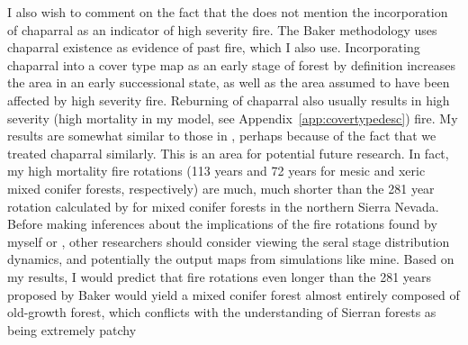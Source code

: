 I also wish to comment on the fact that the \citet{Fule2014} does not mention the incorporation of chaparral as an indicator of high severity fire. The Baker methodology uses chaparral existence as evidence of past fire, which I also use. Incorporating chaparral into a cover type map as an early stage of forest by definition increases the area in an early successional state, as well as the area assumed to have been affected by high severity fire. Reburning of chaparral also usually results in high severity (high mortality in my model, see Appendix~\ref{app:covertypedesc}) fire. My results are somewhat similar to those in \citet{Baker2014}, perhaps because of the fact that we treated chaparral similarly. This is an area for potential future research. In fact, my high mortality fire rotations (113 years and 72 years for mesic and xeric mixed conifer forests, respectively) are much, much shorter than the 281 year rotation calculated by \citet{Baker2014} for mixed conifer forests in the northern Sierra Nevada. Before making inferences about the implications of the fire rotations found by myself or \citet{Baker2014}, other researchers should consider viewing the seral stage distribution dynamics, and potentially the output maps from simulations like mine. Based on my results, I would predict that fire rotations even longer than the 281 years proposed by Baker would yield a mixed conifer forest almost entirely composed of old-growth forest, which conflicts with the understanding of Sierran forests as being extremely patchy \citep{Franklin1996,SNEP1996}  

